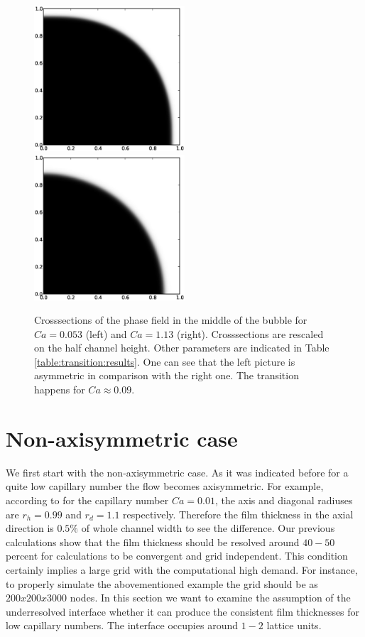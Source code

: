 \documentclass{article}
\begin{document}
\begin{figure}[ht]
\includegraphics[width=0.5\textwidth]{Figures/phase_crossection_ca5.eps}
\includegraphics[width=0.5\textwidth]{Figures/phase_crossection_ca13.eps}\\
\caption{Crosssections of the phase field in the middle of the bubble for $Ca=0.053$
(left) and $Ca=1.13$ (right). Crosssections are rescaled on the half channel height. Other
parameters are indicated in Table \ref{table:transition:results}. One can see that the left picture
is asymmetric in comparison
with the right one. The transition happens for $Ca\approx 0.09$.\label{fig:crosssections:sym}}
\end{figure}


\section{Non-axisymmetric case}
We first start with the non-axisymmetric case. As it was indicated before for a quite low capillary
number the flow becomes axisymmetric. For
example, according to \cite{heil-threedim} for the capillary
number $Ca=0.01$, the axis and diagonal radiuses are $r_h=0.99$ and $r_d=1.1$ respectively.
Therefore the film thickness in the axial direction is  $0.5\%$ of whole channel width to see the
difference. Our previous calculations \cite{kuzmin-binary2d} show that the film thickness should be
 resolved around $40-50$ percent for calculations to be convergent and grid independent. This
condition certainly implies a large grid with the computational high demand. For instance, to
properly simulate the abovementioned example the grid should be as 
$200x200x3000$ nodes. In this section we want to examine the assumption of the underresolved
interface whether it can produce the consistent film thicknesses for low capillary numbers. The
interface occupies around $1-2$ lattice units. 
\end{document}
